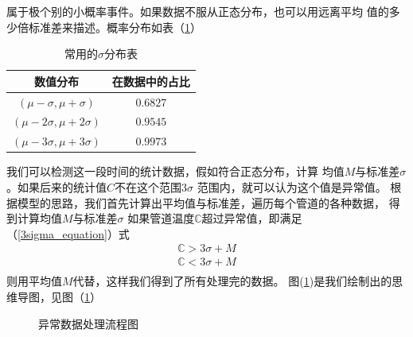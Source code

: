         属于极个别的小概率事件。如果数据不服从正态分布，也可以用远离平均
        值的多少倍标准差来描述。概率分布如表（\ref{sigma_distributiontable}）
        \begin{table}
            \centering
            \begin{tabular}{|c|c|}
                \hline
                数值分布&在数据中的占比\\
                \hline
                $(\mu-\sigma,\mu+\sigma)$&$0.6827$\\
                \hline
                $(\mu-2\sigma,\mu+2\sigma)$&$0.9545$\\
                \hline
                $(\mu-3\sigma,\mu+3\sigma)$&$0.9973$\\
                \hline
            \end{tabular}
            \caption{常用的$\sigma$分布表}
            \label{sigma_distributiontable}
        \end{table}
        我们可以检测这一段时间的统计数据，假如符合正态分布，计算
        均值$M$与标准差$\sigma$。如果后来的统计值$C$不在这个范围$3\sigma$
        范围内，就可以认为这个值是异常值。
        根据模型的思路，我们首先计算出平均值与标准差，遍历每个管道的各种数据，
        得到计算均值$M$与标准差$\sigma$
        如果管道温度$\mathbb{C}$超过异常值，即满足（\ref{3sigma_equation}）式
        \begin{equation}
            \begin{aligned}
                \mathbb{C} > 3\sigma + M \\
                \mathbb{C} < 3\sigma + M  \\
            \end{aligned}
            \label{3sigma_equation}
        \end{equation}
        则用平均值$M$代替，这样我们得到了所有处理完的数据。
        图(\ref{flowchart1})是我们绘制出的思维导图，见图（\ref{flowchart1}）
        \begin{figure}
            \centering
            \def\svgwidth{\columnwidth}
            \caption{异常数据处理流程图}
            \label{flowchart1}
        \end{figure}
